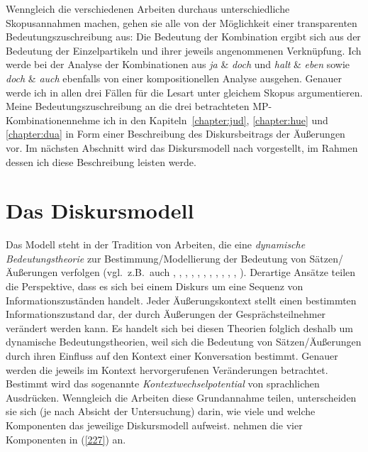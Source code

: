 \noindent
Wenngleich die verschiedenen Arbeiten durchaus unterschiedliche Skopusannahmen machen, gehen sie alle von der Möglichkeit einer transparenten Bedeutungszuschreibung aus: Die Bedeutung der Kombination ergibt sich aus der Bedeutung der Einzelpartikeln und ihrer jeweils angenommenen Verknüpfung. Ich werde bei der Analyse der Kombinationen aus \textit{ja} \& \textit{doch} und \textit{halt} \& \textit{eben} sowie \textit{doch} \& \textit{auch} ebenfalls von einer kompositionellen Analyse ausgehen. Genauer werde ich in allen drei Fällen für die Lesart unter gleichem Skopus argumentieren.\\

\noindent
Meine Bedeutungszuschreibung an die drei betrachteten MP-Kom\-bi\-na\-ti\-on\-en\linebreak nehme ich in den Kapiteln~\ref{chapter:jud}, \ref{chapter:hue} und \ref{chapter:dua} in Form einer Beschreibung des Diskursbeitrags der Äußerungen vor. Im nächsten Abschnitt wird das Diskursmodell nach \citet{Farkas2010} vorgestellt, im Rahmen dessen ich diese Beschreibung leisten werde.

\section{Das Diskursmodell}
\label{sec:diskursmodell}
Das Modell steht in der Tradition von Arbeiten, die eine \textit{dynamische Bedeutungstheorie} zur Bestimmung/Modellierung der Bedeutung von Sätzen/Äußerungen verfolgen (vgl.\ z.B.\ auch \citealt{Hamblin1971}, \citealt{Stalnaker1978}, \citealt{Ginzburg1996}, \citealt{Roberts1996}, \citealt{Giannakidou1998}, \citealt{Bartels1999}, \citealt{Stalnaker2002}, \citealt{Buering2003}, \citealt{Farkas2003}, \citealt{Gunlogson2003}, \citealt{Caponigro2007}, \citealt{Malamud2011}). Derartige Ansätze teilen die Perspektive, dass es sich bei einem Diskurs um eine Sequenz von Informationszuständen handelt. Jeder Äußerungskontext stellt einen bestimmten Informationszustand dar, der durch Äußerungen der Gesprächsteil\-nehmer verändert werden kann. Es handelt sich bei diesen Theorien folglich deshalb um dynamische Bedeutungstheorien, weil sich die Bedeutung von Sätzen/Äußerungen durch ihren Einfluss auf den Kontext einer Konversation bestimmt. Genauer werden die jeweils im Kontext hervorgerufenen Veränderungen betrachtet. Bestimmt wird das sogenannte \textit{Kontextwechselpotential} von sprachlichen Ausdrücken. Wenngleich die Arbeiten diese Grundannahme teilen, unterscheiden sie sich (je nach Absicht der Untersuchung) darin, wie viele und welche Komponenten das jeweilige Diskursmodell aufweist. \citet{Farkas2010} nehmen die vier Komponenten in (\ref{227}) an.

